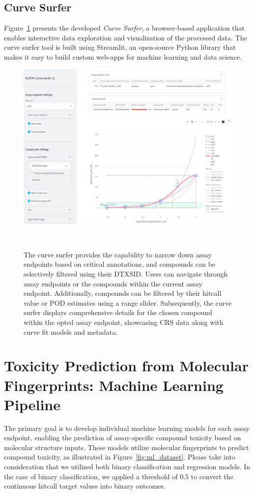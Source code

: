 \subsection{Curve Surfer}
Figure~\ref{fig:curve_surfer} presents the developed \emph{Curve Surfer}, a browser-based application that enables interactive data exploration and visualization of the processed data. The curve surfer tool is built using Streamlit, an open-source Python library that makes it easy to build custom web-apps for machine learning and data science. 

\begin{figure}  %
    \centering
    \includegraphics[width=1.0\textwidth]{figures/curve_surfer.png}
    \caption{The curve surfer provides the capability to narrow down assay endpoints based on critical annotations, and compounds can be selectively filtered using their DTXSID. Users can navigate through assay endpoints or the compounds within the current assay endpoint. Additionally, compounds can be filtered by their hitcall value or POD estimates using a range slider. Subsequently, the curve surfer displays comprehensive details for the chosen compound within the opted assay endpoint, showcasing CRS data along with curve fit models and metadata.}
~\label{fig:curve_surfer}
\end{figure}


\section{Toxicity Prediction from Molecular Fingerprints: Machine Learning Pipeline}
The primary goal is to develop individual machine learning models for each assay endpoint, enabling the prediction of assay-specific compound toxicity based on molecular structure inputs. These models utilize molecular fingerprints to predict compound toxicity, as illustrated in Figure~\ref{fig:ml_dataset}. Please take into consideration that we utilized both binary classification and regression models. In the case of binary classification, we applied a threshold of $0.5$ to convert the continuous hitcall target values into binary outcomes.


